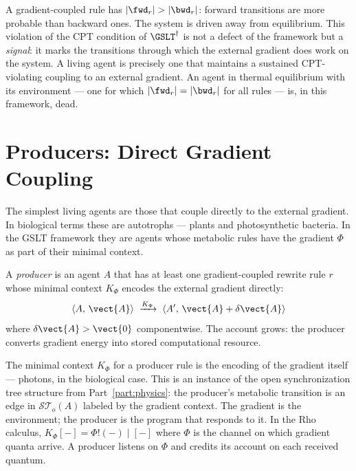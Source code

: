 \begin{remark}
A gradient-coupled rule has $|\fwd_r| > |\bwd_r|$: forward
transitions are more probable than backward ones.
The system is driven away from equilibrium.
This violation of the CPT condition of $\GSLT^\dagger$ is not a
defect of the framework but a \emph{signal}: it marks the
transitions through which the external gradient does work on the
system.
A living agent is precisely one that maintains a sustained
CPT-violating coupling to an external gradient.
An agent in thermal equilibrium with its environment --- one for
which $|\fwd_r| = |\bwd_r|$ for all rules --- is, in this
framework, dead.
\end{remark}

\section{Producers: Direct Gradient Coupling}

The simplest living agents are those that couple directly to the
external gradient.
In biological terms these are autotrophs --- plants and
photosynthetic bacteria.
In the GSLT framework they are agents whose metabolic rules have
the gradient $\Phi$ as part of their minimal context.

\begin{definition}[Producer]
A \emph{producer} is an agent $A$ that has at least one
gradient-coupled rewrite rule $r$ whose minimal context
$K_\Phi$ encodes the external gradient directly:
\[
  \langle A,\, \vect{A} \rangle
  \;\xrightarrow{K_\Phi}\;
  \langle A',\, \vect{A} + \delta\vect{A} \rangle
\]
where $\delta\vect{A} > \vect{0}$ componentwise.
The account grows: the producer converts gradient energy into
stored computational resource.
\end{definition}

\begin{remark}
The minimal context $K_\Phi$ for a producer rule is the encoding
of the gradient itself --- photons, in the biological case.
This is an instance of the open synchronization tree structure
from Part~\ref{part:physics}: the producer's metabolic transition is an edge in
$\mathcal{ST}_o(A)$ labeled by the gradient context.
The gradient is the environment; the producer is the program
that responds to it.
In the Rho calculus, $K_\Phi[-] = \Phi!(- ) \mid [-]$ where
$\Phi$ is the channel on which gradient quanta arrive.
A producer listens on $\Phi$ and credits its account on each
received quantum.
\end{remark}

